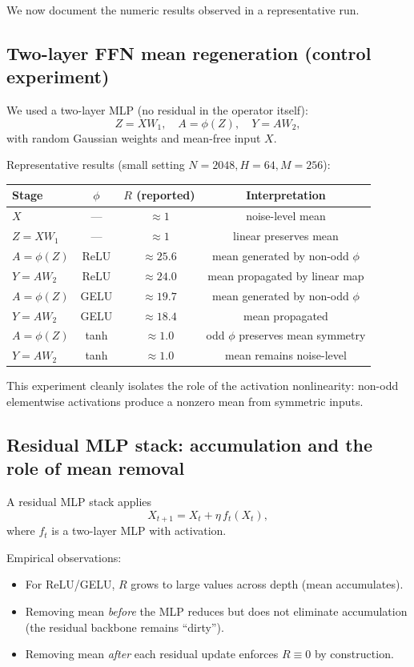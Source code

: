 We now document the numeric results observed in a representative run.

\subsection{Two-layer FFN mean regeneration (control experiment)}

We used a two-layer MLP (no residual in the operator itself):
\[
Z = XW_1,\quad A=\phi(Z),\quad Y = AW_2,
\]
with random Gaussian weights and mean-free input $X$.

Representative results (small setting $N=2048, H=64, M=256$):
\begin{center}
\begin{tabular}{lccc}
\toprule
Stage & $\phi$ & $R$ (reported) & Interpretation \\
\midrule
$X$ & --- & $\approx 1$ & noise-level mean \\
$Z=XW_1$ & --- & $\approx 1$ & linear preserves mean \\
$A=\phi(Z)$ & ReLU & $\approx 25.6$ & mean generated by non-odd $\phi$ \\
$Y=AW_2$ & ReLU & $\approx 24.0$ & mean propagated by linear map \\
$A=\phi(Z)$ & GELU & $\approx 19.7$ & mean generated by non-odd $\phi$ \\
$Y=AW_2$ & GELU & $\approx 18.4$ & mean propagated \\
$A=\phi(Z)$ & tanh & $\approx 1.0$ & odd $\phi$ preserves mean symmetry \\
$Y=AW_2$ & tanh & $\approx 1.0$ & mean remains noise-level \\
\bottomrule
\end{tabular}
\end{center}

This experiment cleanly isolates the role of the activation nonlinearity: non-odd elementwise activations produce a nonzero mean from symmetric inputs.

\subsection{Residual MLP stack: accumulation and the role of mean removal}

A residual MLP stack applies
\[
X_{t+1} = X_t + \eta\,f_t(X_t),
\]
where $f_t$ is a two-layer MLP with activation.

Empirical observations:
\begin{itemize}
\item For ReLU/GELU, $R$ grows to large values across depth (mean accumulates).
\item Removing mean \emph{before} the MLP reduces but does not eliminate accumulation (the residual backbone remains ``dirty'').
\item Removing mean \emph{after} each residual update enforces $R\equiv 0$ by construction.
\end{itemize}

